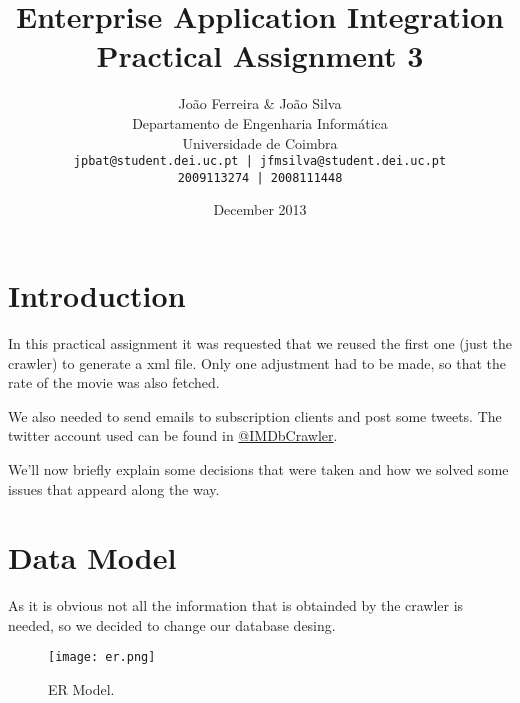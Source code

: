 \documentclass[12pt]{article}
\title{Enterprise Application Integration \\ Practical Assignment 3}
\author{
		João Ferreira \& João Silva\\
		Departamento de Engenharia Informática\\
		Universidade de Coimbra\\
		\texttt{jpbat@student.dei.uc.pt | jfmsilva@student.dei.uc.pt}\\
		\texttt{2009113274 | 2008111448}
		}
\date{December 2013}
\begin{document}
\maketitle
\clearpage

\tableofcontents

\setlength{\parindent}{1cm}
\setlength{\parskip}{0.3cm}

\clearpage
\section{Introduction}
\indent \indent In this practical assignment it was requested that we reused the first one (just the crawler) to generate a xml file. Only one adjustment had to be made, so that the rate of the movie was also fetched.

We also needed to send emails to subscription clients and post some tweets. The twitter account used can be found in \href{https://twitter.com/IMDbCrawler}{@IMDbCrawler}.

We'll now briefly explain some decisions that were taken and how we solved some issues that appeard along the way.
\clearpage

\section{Data Model}
\indent \indent As it is obvious not all the information that is obtainded by the crawler is needed, so we decided to change our database desing.

\begin{figure}[h!]
	\centering
	\texttt{[image: er.png]}
	\caption{ER Model.}
\end{figure}
\clearpage
\end{document}
